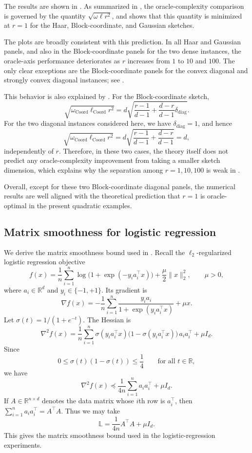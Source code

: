\documentclass[10pt]{article}
\newcommand{\R}{\mathbb{R}}
\newcommand{\Lmat}{\mathbb{L}}
\begin{document}
The results are shown in .
As summarized in , the oracle-complexity comparison
is governed by the quantity \(\sqrt{\omega\ell r^2}\), and 
shows that this quantity is minimized at \(r=1\) for the Haar, Block-coordinate,
and Gaussian sketches.

The plots are broadly consistent with this prediction.
In all Haar and Gaussian panels, and also in the Block-coordinate panels for the two dense
instances, the oracle-axis performance deteriorates as \(r\) increases from \(1\) to \(10\)
and \(100\).
The only clear exceptions are the Block-coordinate panels for the convex diagonal and
strongly convex diagonal instances; see
.

This behavior is also explained by .
For the Block-coordinate sketch,
\[
\sqrt{\omega_{\mathrm{Coord}}\ell_{\mathrm{Coord}}r^2}
=
d\sqrt{\frac{r-1}{d-1}+\frac{d-r}{d-1}\delta_{\mathrm{diag}}}.
\]
For the two diagonal instances considered here, we have \(\delta_{\mathrm{diag}}=1\), and hence
\[
\sqrt{\omega_{\mathrm{Coord}}\ell_{\mathrm{Coord}}r^2}
=
d\sqrt{\frac{r-1}{d-1}+\frac{d-r}{d-1}}
=
d,
\]
independently of \(r\).
Therefore, in these two cases, the theory itself does not predict any oracle-complexity
improvement from taking a smaller sketch dimension, which explains why the separation
among \(r=1,10,100\) is weak in
.

Overall, except for these two Block-coordinate diagonal panels, the numerical results are
well aligned with the theoretical prediction that \(r=1\) is oracle-optimal in the present
quadratic examples.


\subsection{Matrix smoothness for logistic regression}
\label{app:logreg-smoothness}

We derive the matrix smoothness bound used in . Recall the
\(\ell_2\)-regularized logistic regression objective
\[
f(x)
=
\frac{1}{n}\sum_{i=1}^n \log\!\bigl(1+\exp(-y_i a_i^\top x)\bigr)
+\frac{\mu}{2}\|x\|_2^2,
\qquad \mu>0,
\]
where \(a_i\in\R^d\) and \(y_i\in\{-1,+1\}\). Its gradient is
\[
\nabla f(x)
=
-\frac{1}{n}\sum_{i=1}^n
\frac{y_i a_i}{1+\exp(y_i a_i^\top x)}
+\mu x.
\]
Let \(\sigma(t)=1/(1+e^{-t})\). The Hessian is
\[
\nabla^2 f(x)
=
\frac{1}{n}\sum_{i=1}^n
\sigma(y_i a_i^\top x)\bigl(1-\sigma(y_i a_i^\top x)\bigr)\,a_i a_i^\top
+\mu I_d.
\]
Since
\[
0\le \sigma(t)(1-\sigma(t))\le \frac14
\qquad\text{for all }t\in\R,
\]
we have
\[
\nabla^2 f(x)
\preceq
\frac{1}{4n}\sum_{i=1}^n a_i a_i^\top+\mu I_d.
\]
If \(A\in\R^{n\times d}\) denotes the data matrix whose \(i\)th row is
\(a_i^\top\), then \(\sum_{i=1}^n a_i a_i^\top=A^\top A\). Thus we may take
\[
\Lmat
=
\frac{1}{4n}A^\top A+\mu I_d.
\]
This gives the matrix smoothness bound used in the logistic-regression
experiments.
\end{document}
